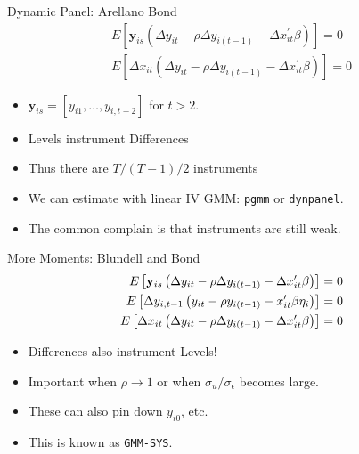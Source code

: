 \documentclass[aspectratio=169]{beamer}
\begin{document}
\begin{frame}{Dynamic Panel: Arellano Bond}
\begin{eqnarray*}
E\left[\mathbf{y}_{i s}\left(\Delta y_{i t}-\rho \Delta y_{i(t-1)}-\Delta x_{i t}^{\prime} \beta\right)\right]=0\\
E\left[\Delta x_{it} \left(\Delta y_{i t}-\rho \Delta y_{i(t-1)}-\Delta x_{i t}^{\prime} \beta\right)\right]=0
\end{eqnarray*}
\begin{itemize}
\item $\mathbf{y}_{is}= [y_{i1},\ldots,y_{i,t-2}]$ for $t>2$.
\item \alert{Levels} instrument \alert{Differences}
\item Thus there are $T/(T-1)/2$ instruments
\item We can estimate with linear IV GMM:  \texttt{pgmm} or \texttt{dynpanel}.
\item The common complain is that \alert{instruments are still weak}.
\end{itemize}
\end{frame}

\begin{frame}{More Moments: Blundell and Bond}
\begin{align*}
E\left[\mathbf{y}_{i s}\left(\Delta y_{i t}-\rho \Delta y_{i(t-1)}-\Delta x_{i t}^{\prime} \beta\right)\right]&=0\\
E\left[\Delta y_{i,t-1} \left(y_{i t}-\rho y_{i(t-1)}- x_{i t}^{\prime} \beta\-\eta_i \right)\right]&=0\\
E\left[\Delta x_{it} \left(\Delta y_{i t}-\rho \Delta y_{i(t-1)}-\Delta x_{i t}^{\prime} \beta\right)\right]&=0
\end{align*}
\begin{itemize}
\item \alert{Differences} also instrument \alert{Levels}!
\item Important when $\rho \rightarrow 1$ or when $\sigma_u/\sigma_{\epsilon}$ becomes large.
\item These can also pin down $y_{i0}$, etc.
\item This is known as \texttt{GMM-SYS}.
\end{itemize}
\end{frame}
\end{document}
